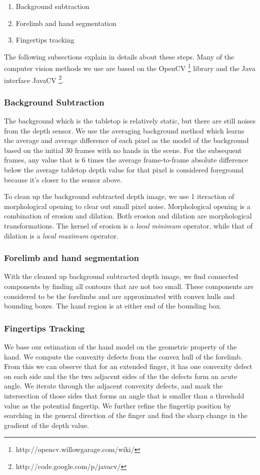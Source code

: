 \begin{enumerate}
  \item Background subtraction
  \item Forelimb and hand segmentation
  \item Fingertips tracking
\end{enumerate}

The following subsections explain in details about these steps. Many of the
computer vision methods we use are based on the OpenCV
\footnote{http://opencv.willowgarage.com/wiki/} library and the Java interface JavaCV \footnote{http://code.google.com/p/javacv/}.

\subsubsection{Background Subtraction}
The background which is the tabletop is relatively static, but there are still 
noises from the depth sensor. We use the averaging background method which
learns the average and average difference of each pixel as the model of the 
background based on the initial 30 frames with no hands in the scene. For the
subsequent frames, any value that is 6 times the average frame-to-frame absolute
difference below the average tabletop depth value for that pixel is considered 
foreground because it's closer to the sensor above.

To clean up the background subtracted depth image, we use 1 iteraction of
morphological opening to clear out small pixel noise. Morphological opening is a
combination of erosion and dilation. Both erosion and dilation are morphological
transformations. The kernel of erosion is a \textit{local minimum} operator,
while that of dilation is a \textit{local maximum} operator.

\subsubsection{Forelimb and hand segmentation}
With the cleaned up background subtracted depth image, we find connected
components by finding all contours that are not too small. These components are
considered to be the forelimbs and are approximated with convex hulls and 
bounding boxes. The hand region is at either end of the bounding box.

\subsubsection{Fingertips Tracking}
We base our estimation of the hand model on the geometric property of the
hand. We compute the convexity defects from the convex hull of the forelimb.
From this we can observe that for an extended finger, it has one convexity
defect on each side and the the two adjacent sides of the the defects form an
acute angle. We iterate through the adjacent convexity defects, and mark the
intersection of those sides that forms an angle that is smaller than a threshold
value as the potential fingertip. We further refine the fingertip position by
searching in the general direction of the finger and find the sharp change in
the gradient of the depth value.


